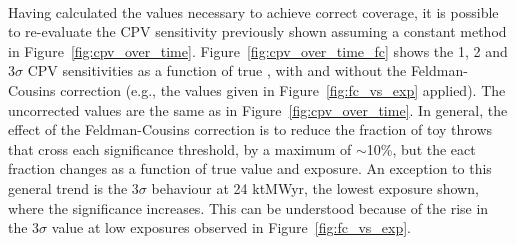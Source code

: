 \begin{figure*}[htbp]
  \centering
  \\
  \caption{Fraction of throws for which the DUNE sensitivity to CP-violation ($\deltacp \neq [0,\pm\pi]$) exceeds 1--3$\sigma$ significance, calculated using constant-\dchisq (dashed lines) and \dchisqcrit values calculated using the Feldman-Cousins method (shaded histograms), as a function of the true value of \deltacp. Shown for NH, for a number of different exposures. The number of throws used to make each figure is also shown.}
  \label{fig:cpv_over_time_fc}
\end{figure*}
Having calculated the \dchisqcrit values necessary to achieve correct coverage, it is possible to re-evaluate the CPV sensitivity previously shown assuming a constant \dchisq method in Figure~\ref{fig:cpv_over_time}. Figure~\ref{fig:cpv_over_time_fc} shows the 1, 2 and 3$\sigma$ CPV sensitivities as a function of true \deltacp, with and without the Feldman-Cousins correction (e.g., the \dchisqcrit values given in Figure~\ref{fig:fc_vs_exp} applied). The uncorrected values are the same as in Figure~\ref{fig:cpv_over_time}. In general, the effect of the Feldman-Cousins correction is to reduce the fraction of toy throws that cross each significance threshold, by a maximum of $\sim$10\%, but the eact fraction changes as a function of true \deltacp value and exposure. An exception to this general trend is the 3$\sigma$ behaviour at 24 ktMWyr, the lowest exposure shown, where the significance increases. This can be understood because of the rise in the 3$\sigma$ \dchisqcrit value at low exposures observed in Figure~\ref{fig:fc_vs_exp}.

